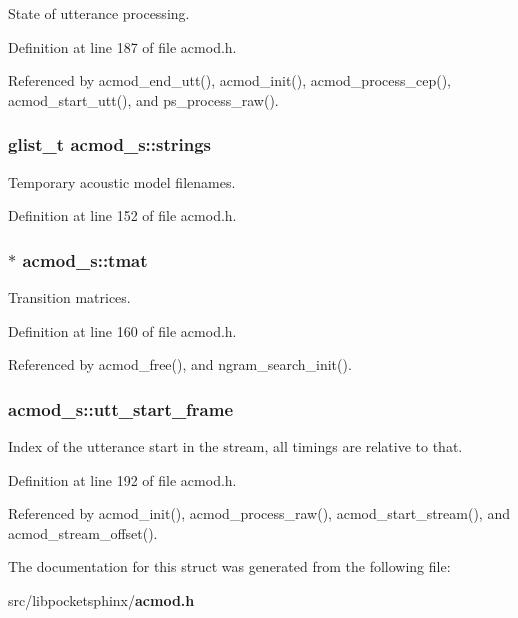 State of utterance processing. 



Definition at line 187 of file acmod.\+h.



Referenced by acmod\+\_\+end\+\_\+utt(), acmod\+\_\+init(), acmod\+\_\+process\+\_\+cep(), acmod\+\_\+start\+\_\+utt(), and ps\+\_\+process\+\_\+raw().

\subsubsection[{strings}]{\setlength{\rightskip}{0pt plus 5cm}glist\+\_\+t acmod\+\_\+s\+::strings}\label{structacmod__s_a9f6b699a0fbd43cf7ababab6f0ab81be}


Temporary acoustic model filenames. 



Definition at line 152 of file acmod.\+h.

\subsubsection[{tmat}]{$\ast$ acmod\+\_\+s\+::tmat}\label{structacmod__s_aaa3982184a49f0d61e397ba89f486259}


Transition matrices. 



Definition at line 160 of file acmod.\+h.



Referenced by acmod\+\_\+free(), and ngram\+\_\+search\+\_\+init().

\subsubsection[{utt\+\_\+start\+\_\+frame}]{ acmod\+\_\+s\+::utt\+\_\+start\+\_\+frame}\label{structacmod__s_aecf7cf72f18a8ecb1cc8e96928bc1ad4}


Index of the utterance start in the stream, all timings are relative to that. 



Definition at line 192 of file acmod.\+h.



Referenced by acmod\+\_\+init(), acmod\+\_\+process\+\_\+raw(), acmod\+\_\+start\+\_\+stream(), and acmod\+\_\+stream\+\_\+offset().



The documentation for this struct was generated from the following file\+:\begin{DoxyCompactItemize}
\item 
src/libpocketsphinx/{\bf acmod.\+h}\end{DoxyCompactItemize}
